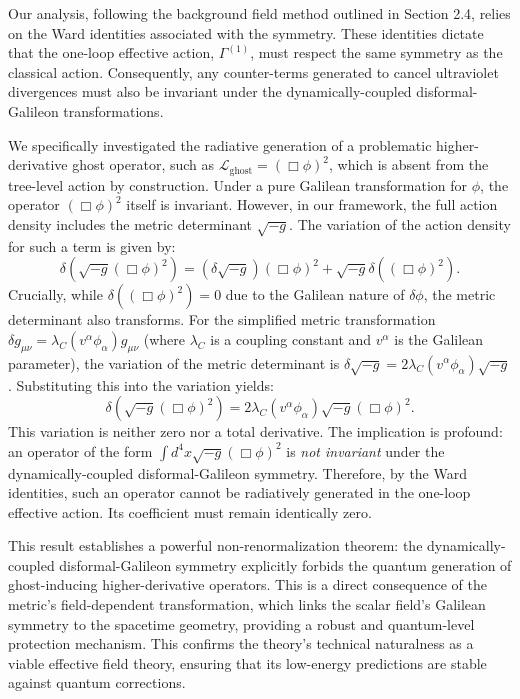 \documentclass[twocolumn]{aastex631}
\begin{document}
Our analysis, following the background field method outlined in Section 2.4, relies on the Ward identities associated with the symmetry. These identities dictate that the one-loop effective action, $\Gamma^{(1)}$, must respect the same symmetry as the classical action. Consequently, any counter-terms generated to cancel ultraviolet divergences must also be invariant under the dynamically-coupled disformal-Galileon transformations.

We specifically investigated the radiative generation of a problematic higher-derivative ghost operator, such as $\mathcal{L}_{\text{ghost}} = (\Box \phi)^2$, which is absent from the tree-level action by construction. Under a pure Galilean transformation for $\phi$, the operator $(\Box \phi)^2$ itself is invariant. However, in our framework, the full action density includes the metric determinant $\sqrt{-g}$. The variation of the action density for such a term is given by:
\begin{equation}
\delta \left( \sqrt{-g} (\Box \phi)^2 \right) = \left( \delta \sqrt{-g} \right) (\Box \phi)^2 + \sqrt{-g} \delta \left( (\Box \phi)^2 \right).
\end{equation}
Crucially, while $\delta \left( (\Box \phi)^2 \right) = 0$ due to the Galilean nature of $\delta \phi$, the metric determinant also transforms. For the simplified metric transformation $\delta g_{\mu\nu} = \lambda_C (v^\alpha \phi_\alpha) g_{\mu\nu}$ (where $\lambda_C$ is a coupling constant and $v^\alpha$ is the Galilean parameter), the variation of the metric determinant is $\delta \sqrt{-g} = 2 \lambda_C (v^\alpha \phi_\alpha) \sqrt{-g}$. Substituting this into the variation yields:
\begin{equation}
\delta \left( \sqrt{-g} (\Box \phi)^2 \right) = 2 \lambda_C (v^\alpha \phi_\alpha) \sqrt{-g} (\Box \phi)^2.
\end{equation}
This variation is neither zero nor a total derivative. The implication is profound: an operator of the form $\int d^4x \sqrt{-g} (\Box \phi)^2$ is \textit{not invariant} under the dynamically-coupled disformal-Galileon symmetry. Therefore, by the Ward identities, such an operator cannot be radiatively generated in the one-loop effective action. Its coefficient must remain identically zero.

This result establishes a powerful non-renormalization theorem: the dynamically-coupled disformal-Galileon symmetry explicitly forbids the quantum generation of ghost-inducing higher-derivative operators. This is a direct consequence of the metric's field-dependent transformation, which links the scalar field's Galilean symmetry to the spacetime geometry, providing a robust and quantum-level protection mechanism. This confirms the theory's technical naturalness as a viable effective field theory, ensuring that its low-energy predictions are stable against quantum corrections.
\end{document}
